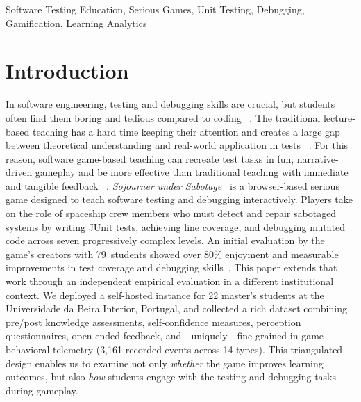 \documentclass[conference]{IEEEtran}
\begin{document}
\begin{IEEEkeywords}
Software Testing Education, Serious Games, Unit Testing, Debugging, Gamification, Learning Analytics
\end{IEEEkeywords}

\section{Introduction}
\label{sec:intro}
In software engineering, testing and debugging skills are crucial, but students often find them boring and tedious compared to coding ~\cite{straubinger2023survey, garousi2020testing}. The traditional lecture-based teaching has a hard time keeping their attention and creates a large gap between theoretical understanding and real-world application in tests ~\cite{mccauley2008debugging, jamil2016testing}. For this reason, software game-based teaching can recreate test tasks in fun, narrative-driven gameplay and be more effective than traditional teaching with immediate and tangible feedback ~\cite{connolly2012systematic, blanco2023gamification}.
\emph{Sojourner under Sabotage}~\cite{straubinger2025sojourner} is a browser-based serious game designed to teach software testing and debugging interactively.
Players take on the role of spaceship crew members who must detect and repair sabotaged systems by writing JUnit tests, achieving line coverage, and debugging mutated code across seven progressively complex levels.
An initial evaluation by the game's creators with 79~students showed over 80\% enjoyment and measurable improvements in test coverage and debugging skills~\cite{straubinger2025sojourner}.
This paper extends that work through an independent empirical evaluation in a different institutional context.
We deployed a self-hosted instance for 22 master's students at the Universidade da Beira Interior, Portugal, and collected a rich dataset combining pre/post knowledge assessments, self-confidence measures, perception questionnaires, open-ended feedback, and---uniquely---fine-grained in-game behavioral telemetry (3,161 recorded events across 14 types).
This triangulated design enables us to examine not only \emph{whether} the game improves learning outcomes, but also \emph{how} students engage with the testing and debugging tasks during gameplay.
\end{document}
